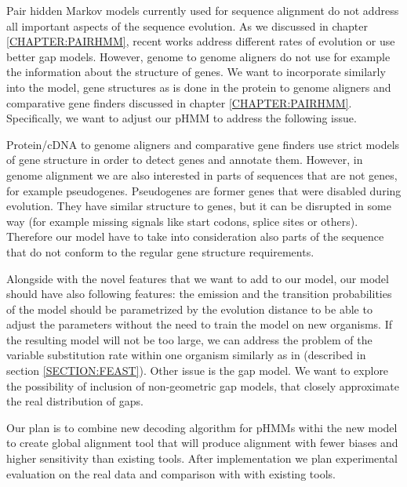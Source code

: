 Pair hidden Markov models currently used for sequence alignment do not address
all important aspects of the sequence evolution. As we discussed in chapter
\ref{CHAPTER:PAIRHMM}, recent works address different rates of evolution or use
better gap models. However, genome to genome aligners do not use for example the
information about the structure of genes. We want to incorporate similarly into
the model, gene structures as is done in the protein to genome aligners and
comparative gene finders discussed in chapter \ref{CHAPTER:PAIRHMM}.
Specifically, we want to adjust our pHMM to  address the following issue. 

Protein/cDNA to genome aligners and comparative gene
finders use strict models of  gene structure in order to detect genes and
annotate them.  However, in genome alignment we are also interested in parts of
sequences that are not genes, for example pseudogenes. Pseudogenes are former
genes that were disabled during evolution. They have similar structure to genes,
but it can be disrupted in some way (for example missing signals
like start codons, splice sites or others). Therefore our model have to take
into consideration also parts of the sequence that do not conform to the regular gene
structure requirements.

Alongside with the novel features that we want to add to our model, our model
should have also following features: the emission and the transition
probabilities of the model should be parametrized by the evolution distance to
be able to adjust the parameters without the need to train the model on new
organisms. If the resulting model will not be too large, we can address the
problem of the variable substitution rate within one organism similarly as in
\cite{Hudek2010} (described in section \ref{SECTION:FEAST}). Other issue is the
gap model. We want to explore the possibility of inclusion of non-geometric gap
models, that closely approximate the real distribution of gaps. 


Our plan is to combine new decoding algorithm for pHMMs withi the new model to
create global alignment tool that will produce alignment with fewer biases and
higher sensitivity than existing tools. After implementation we plan
experimental evaluation on the real data and comparison with with existing
tools.  


\label{LastPage}

